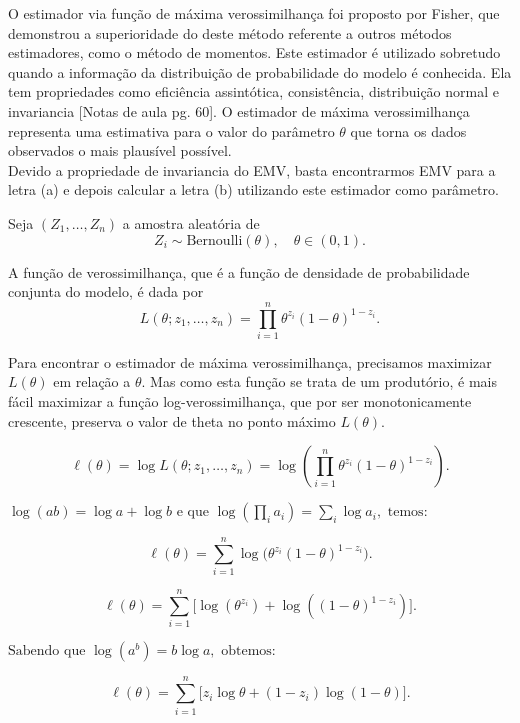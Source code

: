 O estimador via função de máxima verossimilhança foi proposto por Fisher, que demonstrou a superioridade do deste método referente a outros métodos estimadores, como o método de momentos. 
Este estimador é utilizado sobretudo quando a informação da distribuição de probabilidade do modelo é conhecida. 
Ela tem propriedades como eficiência assintótica, consistência, distribuição normal e invariancia [Notas de aula pg. 60]. 
O estimador de máxima verossimilhança representa uma estimativa para o valor do parâmetro $\theta$ que torna os dados observados o mais plausível possível. 
\\[0.5em]
Devido a propriedade de invariancia do EMV, basta encontrarmos EMV para a letra (a) e depois calcular a letra (b) utilizando este estimador como parâmetro.


Seja \( (Z_1, \dots, Z_n) \) a amostra aleatória de 
\[
Z_i \sim \mathrm{Bernoulli}(\theta), \quad \theta \in (0,1).
\]

A função de verossimilhança, que é a função de densidade de probabilidade conjunta do modelo, é dada por
\[
L(\theta; z_1, \dots, z_n)
= \prod_{i=1}^n \theta^{z_i}(1-\theta)^{1-z_i}.
\]

Para encontrar o estimador de máxima verossimilhança, precisamos maximizar \( L(\theta) \) em relação a \( \theta \). Mas como esta função se trata de um produtório,
é mais fácil maximizar a função log-verossimilhança, que por ser monotonicamente crescente, preserva o valor de theta no ponto máximo \( L(\theta) \).



\[
\ell(\theta)
= \log L(\theta; z_1, \ldots, z_n)
= \log\!\left(\prod_{i=1}^{n} \theta^{z_i}(1-\theta)^{1-z_i}\right).
\]


\(
\log(ab) = \log a + \log b \text{ e que } 
\log\!\left(\prod_i a_i\right) = \sum_i \log a_i, \text{ temos:}
\)

\[
\ell(\theta)
= \sum_{i=1}^{n} \log\!\big(\theta^{z_i}(1-\theta)^{1-z_i}\big).
\]


\[
\ell(\theta)
= \sum_{i=1}^{n} \big[\log(\theta^{z_i}) + \log((1-\theta)^{1-z_i})\big].
\]

\(
\text{Sabendo que } \log(a^b) = b\log a, \text{ obtemos:}
\)

\[
\ell(\theta)
= \sum_{i=1}^{n} \big[z_i \log \theta + (1 - z_i)\log(1-\theta)\big].
\]

